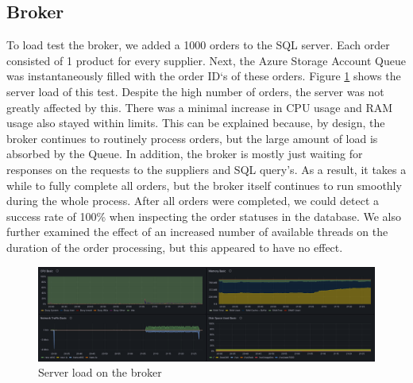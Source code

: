\documentclass[10pt,a4paper,kul]{kulakarticle} %
\begin{document}
		\subsection{Broker}
			To load test the broker, we added a 1000 orders to the SQL server. Each order consisted of 1 product for every supplier. Next, the Azure Storage Account Queue was instantaneously filled with the order ID`s of these orders. Figure \ref{fig:broker_load} shows the server load of this test. Despite the high number of orders, the server was not greatly affected by this. There was a minimal increase in CPU usage and RAM usage also stayed within limits. This can be explained because, by design, the broker continues to routinely process orders, but the large amount of load is absorbed by the Queue. In addition, the broker is mostly just waiting for responses on the requests to the suppliers and SQL query's. As a result, it takes a while to fully complete all orders, but the broker itself continues to run smoothly during the whole process. After all orders were completed, we could detect a success rate of 100\% when inspecting the order statuses in the database. We also further examined the effect of an increased number of available threads on the duration of the order processing, but this appeared to have no effect.
			\begin{figure}[h!]
				\centering
				\includegraphics[width=0.9\linewidth]{images/broker-load}
				\caption{Server load on the broker}
				\label{fig:broker_load}
			\end{figure}
		
\end{document}
